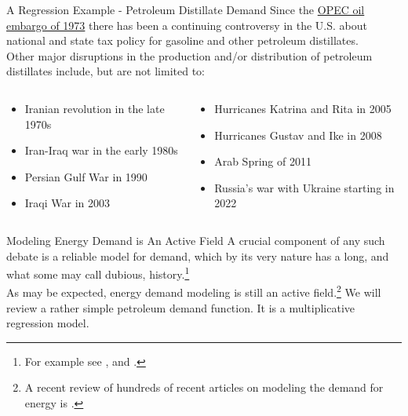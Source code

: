 \documentclass[pdf]{beamer}
\theoremstyle{remark}
\theoremstyle{definition}
\begin{document}
\begin{frame}[t]{A Regression Example - Petroleum Distillate Demand}
Since the \href{https://www.federalreservehistory.org/essays/oil-shock-of-1973-74}{OPEC oil embargo of 1973} there has been a continuing controversy in the U.S. about national and state tax policy for gasoline and other petroleum distillates.  \\
\vspace{1.5ex}
Other major disruptions in the production and/or distribution of petroleum distillates include, but are not limited to:
\vspace{1.5ex}
\begin{columns}[T]
\begin{column}{0.43\textwidth}
  \begin{itemize}
    \item Iranian revolution in the late 1970s 
     \vspace{1.0ex}
    \item Iran-Iraq war in the early 1980s
     \vspace{1.0ex}
    \item Persian Gulf War in 1990
     \vspace{1.0ex}
    \item Iraqi War in 2003
  \end{itemize}
\end{column}
\begin{column}{0.43\textwidth}  %
  \begin{itemize}
    \item Hurricanes Katrina and Rita in 2005
     \vspace{1.0ex}
    \item Hurricanes Gustav and Ike in 2008 
     \vspace{1.0ex}
    \item Arab Spring of 2011
     \vspace{1.0ex}
    \item Russia's war with Ukraine starting in 2022
  \end{itemize}  
\end{column}
\end{columns}
\end{frame}

\begin{frame}[t]{Modeling Energy Demand is An Active Field}
A crucial component of any such debate is a reliable model for demand, which by its very nature has a long, and what some may call dubious, history.\footnote{For example see \cite{sims1980}, \cite{malinvaud1981} and \cite{freedman1983}.}  \\
\vspace{1.5ex}
As may be expected, energy demand modeling is still an active field.\footnote{A recent review of hundreds of recent articles on modeling the demand for energy is \cite{verwiebe2021}.}
\vspace{1.5ex}
We will review a rather simple petroleum demand function.  It is a multiplicative regression model.
\end{frame}
\end{document}
